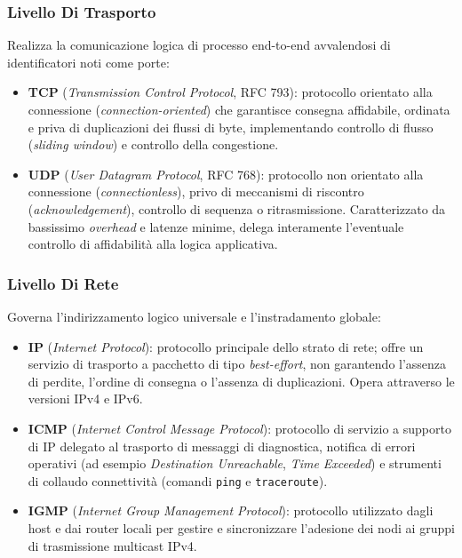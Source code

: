 \documentclass[11pt, a4paper]{article}
\begin{document}
\subsubsection{Livello Di Trasporto}
Realizza la comunicazione logica di processo end-to-end avvalendosi di identificatori noti come porte:
\begin{itemize}
    \item \textbf{TCP} (\emph{Transmission Control Protocol}, RFC 793): protocollo orientato alla connessione (\emph{connection-oriented}) che garantisce consegna affidabile, ordinata e priva di duplicazioni dei flussi di byte, implementando controllo di flusso (\emph{sliding window}) e controllo della congestione.
    \item \textbf{UDP} (\emph{User Datagram Protocol}, RFC 768): protocollo non orientato alla connessione (\emph{connectionless}), privo di meccanismi di riscontro (\emph{acknowledgement}), controllo di sequenza o ritrasmissione. Caratterizzato da bassissimo \emph{overhead} e latenze minime, delega interamente l'eventuale controllo di affidabilità alla logica applicativa.
\end{itemize}

\subsubsection{Livello Di Rete}
Governa l'indirizzamento logico universale e l'instradamento globale:
\begin{itemize}
    \item \textbf{IP} (\emph{Internet Protocol}): protocollo principale dello strato di rete; offre un servizio di trasporto a pacchetto di tipo \emph{best-effort}, non garantendo l'assenza di perdite, l'ordine di consegna o l'assenza di duplicazioni. Opera attraverso le versioni IPv4 e IPv6.
    \item \textbf{ICMP} (\emph{Internet Control Message Protocol}): protocollo di servizio a supporto di IP delegato al trasporto di messaggi di diagnostica, notifica di errori operativi (ad esempio \emph{Destination Unreachable}, \emph{Time Exceeded}) e strumenti di collaudo connettività (comandi \texttt{ping} e \texttt{traceroute}).
    \item \textbf{IGMP} (\emph{Internet Group Management Protocol}): protocollo utilizzato dagli host e dai router locali per gestire e sincronizzare l'adesione dei nodi ai gruppi di trasmissione multicast IPv4.
\end{itemize}
\end{document}
